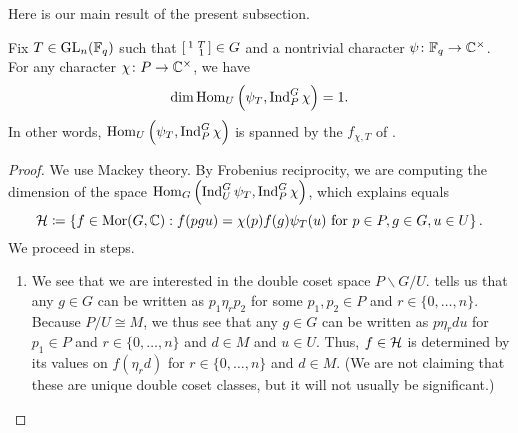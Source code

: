 Here is our main result of the present subsection.
\begin{proposition} \label{prop:psi-t-mult-one}
	Fix $T\in\mathrm{GL}_n(\mathbb F_q)$ such that $\begin{bsmallmatrix}
		1 & T \\ & 1
	\end{bsmallmatrix}\in G$ and a nontrivial character $\psi\colon\mathbb F_q\to\mathbb C^\times$. For any character $\chi\colon P\to\mathbb C^\times$, we have
	\[\dim\operatorname{Hom}_U\left(\psi_T,\operatorname{Ind}_P^G\chi\right)=1.\]
	In other words, $\operatorname{Hom}_U\left(\psi_T,\operatorname{Ind}_P^G\chi\right)$ is spanned by the $f_{\chi,T}$ of .
\end{proposition}
\begin{proof}
	We use Mackey theory. By Frobenius reciprocity, we are computing the dimension of the space $\operatorname{Hom}_G\left(\operatorname{Ind}_U^G\psi_T,\operatorname{Ind}_P^G\chi\right)$, which \cite[Theorem~32.1]{bump-lie-group} explains equals
	\[\mathcal{H}\coloneqq\left\{f\in\operatorname{Mor}(G,\mathbb C):f(pgu)=\chi(p)f(g)\psi_T(u)\text{ for }p\in P,g\in G,u\in U\right\}.\]
	We proceed in steps.
	\begin{enumerate}
		\item We see that we are interested in the double coset space $P\backslash G/U$.  tells us that any $g\in G$ can be written as $p_1\eta_rp_2$ for some $p_1,p_2\in P$ and $r\in\{0,\ldots,n\}$. Because $P/U\cong M$, we thus see that any $g\in G$ can be written as $p\eta_rdu$ for $p_1\in P$ and $r\in\{0,\ldots,n\}$ and $d\in M$ and $u\in U$. Thus, $f\in\mathcal{H}$ is determined by its values on $f(\eta_rd)$ for $r\in\{0,\ldots,n\}$ and $d\in M$. (We are not claiming that these are unique double coset classes, but it will not usually be significant.)


\end{enumerate}
\end{proof}
